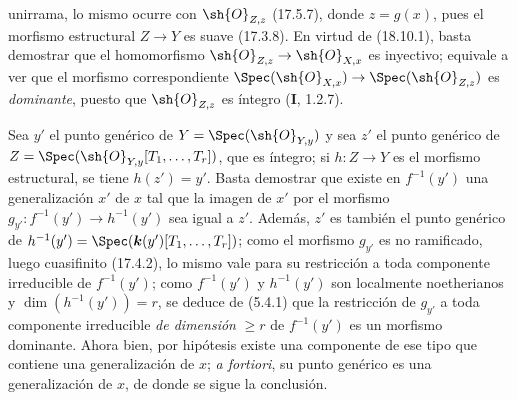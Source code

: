 
unirrama, lo mismo ocurre con $\sh{O}_{Z,z}$ (17.5.7), donde $z=g(x)$, pues el morfismo estructural $Z\to Y$ es suave (17.3.8). En virtud de (18.10.1), basta demostrar que el homomorfismo $\sh{O}_{Z,z}\to\sh{O}_{X,x}$ es inyectivo; equivale a ver que el morfismo correspondiente $\Spec(\sh{O}_{X,x})\to\Spec(\sh{O}_{Z,z})$ es \emph{dominante}, puesto que $\sh{O}_{Z,z}$ es íntegro (\textbf I, 1.2.7).

Sea $y'$ el punto genérico de $Y=\Spec(\sh{O}_{Y,y})$ y sea $z'$ el punto genérico de $Z=\Spec(\sh{O}_{Y,y}[T_1,\ldots,T_r])$, que es íntegro; si $h:Z\to Y$ es el morfismo estructural, se tiene $h(z')=y'$. Basta demostrar que existe en $f^{-1}(y')$ una generalización $x'$ de $x$ tal que la imagen de $x'$ por el morfismo $g_{y'}:f^{-1}(y')\to h^{-1}(y')$ sea igual a $z'$. Además, $z'$ es también el punto genérico de $h^{-1}(y')=\Spec(\boldsymbol{k}(y')[T_1,\ldots,T_r])$; como el morfismo $g_{y'}$ es no ramificado, luego cuasifinito (17.4.2), lo mismo vale para su restricción a toda componente irreducible de $f^{-1}(y')$; como $f^{-1}(y')$ y $h^{-1}(y')$ son localmente noetherianos y $\dim(h^{-1}(y'))=r$, se deduce de (5.4.1) que la restricción de $g_{y'}$ a toda componente irreducible \emph{de dimensión} $\geq r$ de $f^{-1}(y')$ es un morfismo dominante. Ahora bien, por hipótesis existe una componente de ese tipo que contiene una generalización de $x$; \emph{a fortiori}, su punto genérico es una generalización de $x$, de donde se sigue la conclusión.
